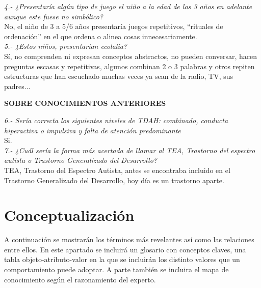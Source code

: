 \documentclass[letterpaper,12pt]{article}
\begin{document}
\textit{4.- ¿Presentaría algún tipo de juego el niño a la edad de los 3 años en adelante aunque este fuese no simbólico?}\\

No, el niño de 3 a 5/6 años presentaría juegos repetitivos, ``rituales de ordenación'' en el que ordena o alinea cosas innecesariamente. \\

\textit{5.- ¿Estos niños, presentarían ecolalia?}\\

Sí, no comprenden ni expresan conceptos abstractos, no pueden conversar, hacen preguntas escasas y repetitivas, algunos combinan 2 o 3 palabras y otros repiten estructuras que han escuchado muchas veces ya sean de la radio, TV, sus padres...

\begin{flushleft}
\textbf{SOBRE CONOCIMIENTOS ANTERIORES}
\end{flushleft}
\textit{6.- Sería correcta los siguientes niveles de TDAH: combinado, conducta hiperactiva o impulsiva y falta de atención predominante} \\

Si.\\

\textit{7.- ¿Cuál sería la forma más acertada de llamar al TEA, Trastorno del espectro autista o Trastorno Generalizado del Desarrollo?} \\

TEA, Trastorno del Espectro Autista, antes se encontraba incluido en el Trastorno Generalizado del Desarrollo, hoy día es un trastorno aparte.
\newpage
\section{Conceptualización}
A continuación se mostrarán los términos más revelantes así como las
relaciones entre ellos. En este apartado se incluirá un glosario con conceptos claves, una tabla objeto-atributo-valor en la que se incluirán los distinto valores que un comportamiento puede adoptar. A parte también se incluira el mapa de conocimiento según el razonamiento del experto.
\end{document}
